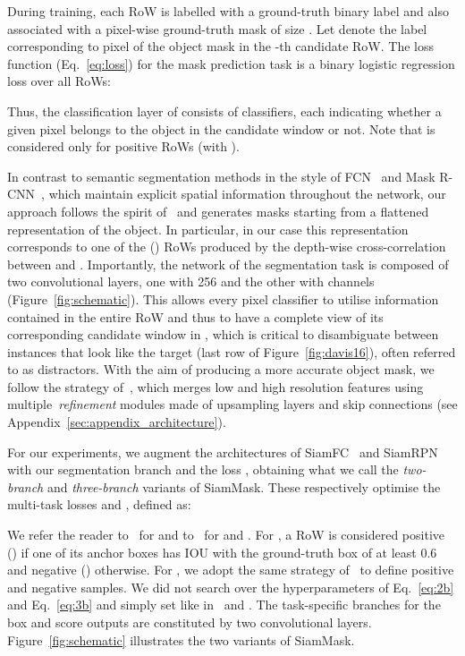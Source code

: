 \documentclass[10pt,twocolumn,letterpaper]{article}
\newcommand{\mypar}[1]{\smallskip\noindent {\bf #1}\enskip}
\begin{document}
\mypar{Loss function.}
During training, each RoW is labelled with a ground-truth binary label  and also associated with a pixel-wise ground-truth mask  of size .
Let  denote the label corresponding to pixel  of the object mask in the -th candidate RoW.
The loss function  (Eq.~\ref{eq:loss}) for the mask prediction task is a binary logistic regression loss over all RoWs:


Thus, the classification layer of  consists of  classifiers, each indicating whether a given pixel belongs to the object in the candidate window or not.
Note that  is considered only for positive RoWs (\ie with ).


\mypar{Mask representation.}
In contrast to semantic segmentation methods in the style of FCN~\cite{long2015fully} and Mask R-CNN~\cite{maskrcnn}, which maintain explicit spatial information throughout the network, our approach follows the spirit of~\cite{DeepMask,SharpMask} and generates masks starting from a flattened representation of the object.
In particular, in our case this representation corresponds to one of the () RoWs produced by the depth-wise cross-correlation between  and .
Importantly, the network  of the segmentation task is composed of two  convolutional layers, one with 256 and the other with  channels (Figure~\ref{fig:schematic}).
This allows every pixel classifier to utilise information contained in the entire RoW and thus to have a complete view of its corresponding candidate window in , which is critical to disambiguate between instances that look like the target (\eg last row of Figure~\ref{fig:davis16}), often referred to as distractors.
With the aim of producing a more accurate object mask, we follow the strategy of~\cite{SharpMask}, which merges low and high resolution features using multiple~\textit{refinement} modules made of upsampling layers and skip connections (see Appendix~\ref{sec:appendix_architecture}).

\mypar{Two variants.}
For our experiments, we augment the architectures of SiamFC~\cite{bertinetto2016fully} and SiamRPN~\cite{SiamRPN} with our segmentation branch and the loss , obtaining what we call the \emph{two-branch} and \emph{three-branch} variants of SiamMask.
These respectively optimise the multi-task losses  and , defined as:


We refer the reader to~\cite[Section 2.2]{bertinetto2016fully} for  and to~\cite[Section 3.2]{SiamRPN} for  and . 
For , a RoW is considered positive () if one of its anchor boxes has IOU with the ground-truth box of at least 0.6 and negative () otherwise.
For , we adopt the same strategy of~\cite{bertinetto2016fully} to define positive and negative samples.
We did not search over the hyperparameters of Eq.~\ref{eq:2b} and Eq.~\ref{eq:3b} and simply set  like in~\cite{DeepMask} and .
The task-specific branches for the box and score outputs are constituted by two  convolutional layers.
Figure~\ref{fig:schematic} illustrates the two variants of SiamMask.
\end{document}
